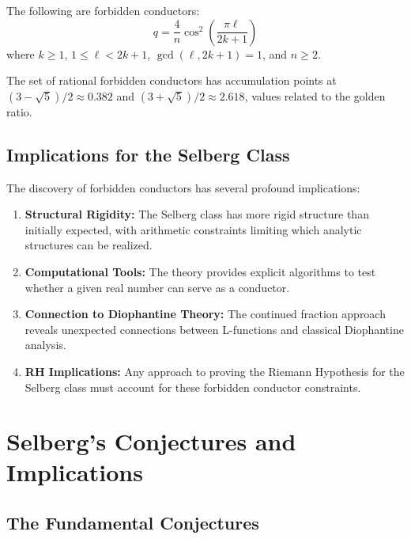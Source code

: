 \begin{theorem}
The following are forbidden conductors:
\begin{equation}
q = \frac{4}{n} \cos^2\left(\frac{\pi\ell}{2k+1}\right)
\end{equation}
where $k \geq 1$, $1 \leq \ell < 2k+1$, $\gcd(\ell, 2k+1) = 1$, and $n \geq 2$.
\end{theorem}

The set of rational forbidden conductors has accumulation points at $(3-\sqrt{5})/2 \approx 0.382$ and $(3+\sqrt{5})/2 \approx 2.618$, values related to the golden ratio.

\subsection{Implications for the Selberg Class}

The discovery of forbidden conductors has several profound implications:

\begin{enumerate}
\item \textbf{Structural Rigidity:} The Selberg class has more rigid structure than initially expected, with arithmetic constraints limiting which analytic structures can be realized.

\item \textbf{Computational Tools:} The theory provides explicit algorithms to test whether a given real number can serve as a conductor.

\item \textbf{Connection to Diophantine Theory:} The continued fraction approach reveals unexpected connections between L-functions and classical Diophantine analysis.

\item \textbf{RH Implications:} Any approach to proving the Riemann Hypothesis for the Selberg class must account for these forbidden conductor constraints.
\end{enumerate}

\section{Selberg's Conjectures and Implications}
\label{sec:selberg-conjectures}

\subsection{The Fundamental Conjectures}

